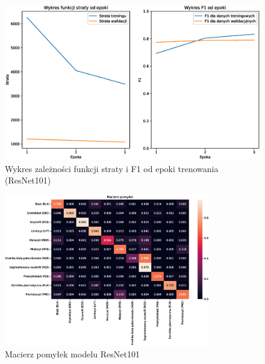 \begin{figure}
    \centering
    \includegraphics[width=\textwidth]{experiments/resnet101/combined}
    \caption{Wykres zależności funkcji straty i F1 od epoki trenowania (ResNet101)}
    \label{fig:plot_resnet101}
\end{figure}
\begin{figure}
    \centering
    \includegraphics[width=0.8\textwidth]{experiments/resnet101/confusion_matrix}
    \caption{Macierz pomyłek modelu ResNet101}
    \label{fig:confusion_resnet101}
\end{figure}

